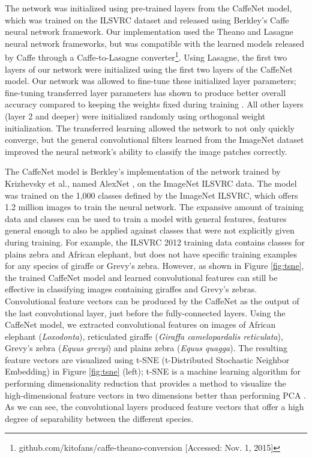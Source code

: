 The network was initialized using pre-trained layers from the CaffeNet model, which was trained on the ILSVRC dataset \cite{russakovsky_imagenet_2015} and released using Berkley's Caffe \cite{jia_caffe:_2014} neural network framework.  Our implementation used the Theano and Lasagne neural network frameworks, but was compatible with the learned models released by Caffe through a Caffe-to-Lasagne converter\footnote{github.com/kitofans/caffe-theano-conversion [Accessed: Nov. 1, 2015]}.  Using Lasagne, the first two layers of our network were initialized using the first two layers of the CaffeNet model.  Our network was allowed to fine-tune these initialized layer parameters; fine-tuning transferred layer parameters has shown to produce better overall accuracy compared to keeping the weights fixed during training \cite{yosinski_how_2014}.  All other layers (layer 2 and deeper) were initialized randomly using orthogonal weight initialization.  The transferred learning \cite{oquab_learning_2014} allowed the network to not only quickly converge, but the general convolutional filters learned from the ImageNet dataset improved the neural network's ability to classify the image patches correctly.

The CaffeNet model is Berkley's implementation of the network trained by Krizhevsky et al., named AlexNet \cite{krizhevsky_imagenet_2012}, on the ImageNet ILSVRC data.  The model was trained on the 1,000 classes defined by the ImageNet ILSVRC, which offers 1.2 million images to train the neural network.  The expansive amount of training data and classes can be used to train a model with general features, features general enough to also be applied against classes that were not explicitly given during training.  For example, the ILSVRC 2012 training data contains classes for plains zebra and African elephant, but does not have specific training examples for any species of giraffe or Grevy's zebra.   However, as shown in Figure \ref{fig:tsne}, the trained CaffeNet model and learned convolutional features can still be effective in classifying images containing giraffes and Grevy's zebras.  Convolutional feature vectors can be produced by the CaffeNet as the output of the last convolutional layer, just before the fully-connected layers.  Using the CaffeNet model, we extracted convolutional features on images of African elephant (\textit{Loxodonta}), reticulated giraffe (\textit{Giraffa camelopardalis reticulata}), Grevy's zebra (\textit{Equus grevyi}) and plains zebra (\textit{Equus quagga}).  The resulting feature vectors are visualized using t-SNE (t-Distributed Stochastic Neighbor Embedding) \cite{van_der_maaten_visualizing_2008} in Figure \ref{fig:tsne} (left); t-SNE is a machine learning algorithm for performing dimensionality reduction that provides a method to visualize the high-dimensional feature vectors in two dimensions better than performing PCA \cite{jolliffe_principal_2002}.  As we can see, the convolutional layers produced feature vectors that offer a high degree of separability between the different species.

